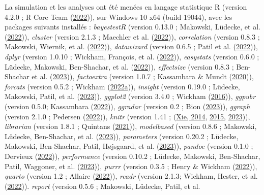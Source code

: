 \documentclass[
  12pt,
]{article}
\begin{document}
La simulation et les analyses ont été menées en langage statistique R
(version 4.2.0 ; R Core Team (\protect\hyperlink{ref-R-base}{2022})),
sur Windows 10 x64 (build 19044), avec les packages suivants installés :
\emph{bayestestR} (version 0.13.0 ; Makowski, Lüdecke, et al.
(\protect\hyperlink{ref-R-bayestestR}{2022})), \emph{cluster} (version
2.1.3 ; Maechler et al. (\protect\hyperlink{ref-R-cluster}{2022})),
\emph{correlation} (version 0.8.3 ; Makowski, Wiernik, et al.
(\protect\hyperlink{ref-R-correlation}{2022})), \emph{datawizard}
(version 0.6.5 ; Patil et al.
(\protect\hyperlink{ref-datawizard2022}{2022})), \emph{dplyr} (version
1.0.10 ; Wickham, François, et al.
(\protect\hyperlink{ref-R-dplyr}{2022})), \emph{easystats} (version
0.6.0 ; Lüdecke, Makowski, Ben-Shachar, et al.
(\protect\hyperlink{ref-R-easystats}{2022})), \emph{effectsize} (version
0.8.3 ; Ben-Shachar et al.
(\protect\hyperlink{ref-R-effectsize}{2023})), \emph{factoextra}
(version 1.0.7 ; Kassambara \& Mundt
(\protect\hyperlink{ref-R-factoextra}{2020})), \emph{forcats} (version
0.5.2 ; Wickham (\protect\hyperlink{ref-R-forcats}{2022a})),
\emph{insight} (version 0.19.0 ; Lüdecke, Makowski, Patil, et al.
(\protect\hyperlink{ref-R-insight}{2023})), \emph{ggplot2} (version
3.4.0 ; Wickham (\protect\hyperlink{ref-ggplot22016}{2016})),
\emph{ggpubr} (version 0.5.0; Kassambara
(\protect\hyperlink{ref-R-ggpubr}{2022})), \emph{ggradar} (version 0.2 ;
Bion (\protect\hyperlink{ref-R-ggradar}{2023})), \emph{ggraph} (version
2.1.0 ; Pedersen (\protect\hyperlink{ref-R-ggraph}{2022})), \emph{knitr}
(version 1.41 ; (\protect\hyperlink{ref-knitr2014}{Xie, 2014},
\protect\hyperlink{ref-knitr2015}{2015},
\protect\hyperlink{ref-R-knitr}{2023})), \emph{librarian} (version 1.8.1
; Quintans (\protect\hyperlink{ref-R-librarian}{2021})),
\emph{modelbased} (version 0.8.6 ; Makowski, Lüdecke, Ben-Shachar, et
al. (\protect\hyperlink{ref-R-modelbased}{2023})), \emph{parameters}
(version 0.20.2 ; Lüdecke, Makowski, Ben-Shachar, Patil, Højsgaard, et
al. (\protect\hyperlink{ref-R-parameters}{2023})), \emph{pandoc}
(version 0.1.0 ; Dervieux (\protect\hyperlink{ref-R-pandoc}{2022})),
\emph{performance} (version 0.10.2 ; Lüdecke, Makowski, Ben-Shachar,
Patil, Waggoner, et al. (\protect\hyperlink{ref-R-performance}{2023})),
\emph{purrr} (version 0.3.5 ; Henry \& Wickham
(\protect\hyperlink{ref-R-purrr}{2022})), \emph{quarto} (version 1.2 ;
Allaire (\protect\hyperlink{ref-R-quarto}{2022})), \emph{readr} (version
2.1.3; Wickham, Hester, et al. (\protect\hyperlink{ref-R-readr}{2022})).
\emph{report} (version 0.5.6 ; Makowski, Lüdecke, Patil, et al.
\end{document}
